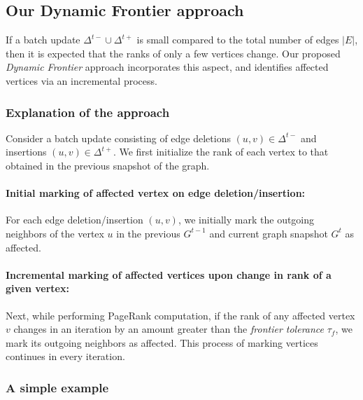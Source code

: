 \subsection{Our Dynamic Frontier approach}
\label{sec:frontier}

If a batch update $\Delta^{t-} \cup \Delta^{t+}$ is small compared to the total number of edges $|E|$, then it is expected that the ranks of only a few vertices change. Our proposed \textit{Dynamic Frontier} approach incorporates this aspect, and identifies affected vertices via an incremental process.


\subsubsection{Explanation of the approach}
\label{sec:frontier-explanation}

Consider a batch update consisting of edge deletions $(u, v) \in \Delta^{t-}$ and insertions $(u, v) \in \Delta^{t+}$. We first initialize the rank of each vertex to that obtained in the previous snapshot of the graph.



\paragraph{Initial marking of affected vertex on edge deletion/insertion:}

For each edge deletion/insertion $(u, v)$, we initially mark the outgoing neighbors of the vertex $u$ in the previous $G^{t-1}$ and current graph snapshot $G^t$ as affected.

\paragraph{Incremental marking of affected vertices upon change in rank of a given vertex:}

Next, while performing PageRank computation, if the rank of any affected vertex $v$ changes in an iteration by an amount greater than the \textit{frontier tolerance} $\tau_f$, we mark its outgoing neighbors as affected. This process of marking vertices continues in every iteration.


\subsubsection{A simple example}


